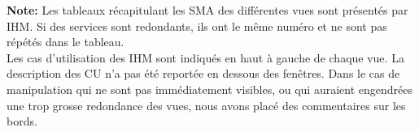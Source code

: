 \begin{shaded}
\textbf{Note: } Les tableaux récapitulant les SMA des différentes vues sont présentés par IHM. Si des services sont redondants, ils ont le même numéro et ne sont pas répétés dans le tableau. \\

Les cas d'utilisation des IHM sont indiqués en haut à gauche de chaque vue. La description des CU n'a pas été reportée en dessous des fenêtres. Dans le cas de manipulation qui ne sont pas immédiatement visibles, ou qui auraient engendrées une trop grosse redondance des vues, nous avons placé des commentaires sur les bords.
\end{shaded}




